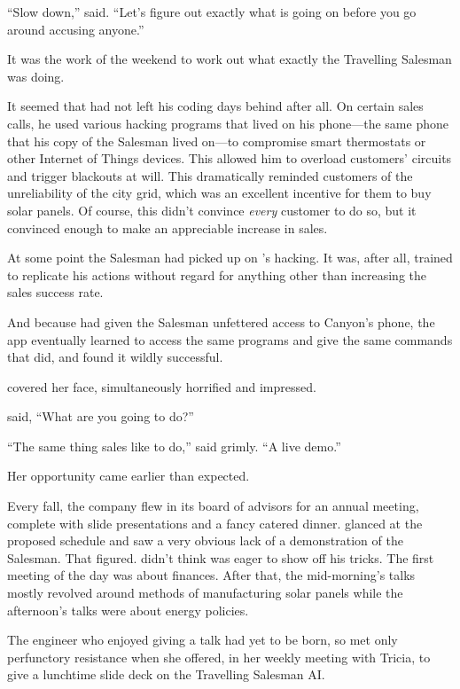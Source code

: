 ``Slow down,'' {\sidetag} said. ``Let's figure out exactly what is going on before you go around accusing anyone.''

It was the work of the weekend to work out what exactly the Travelling Salesman was doing.

It seemed that {\energyJerk} had not left his coding days behind after all. On certain sales calls, he used various hacking programs that lived on his phone---the same phone that his copy of the Salesman lived on---to compromise smart thermostats or other Internet of Things devices. This allowed him to overload customers' circuits and trigger blackouts at will. This dramatically reminded customers of the unreliability of the city grid, which was an excellent incentive for them to buy solar panels. Of course, this didn't convince \emph{every} customer to do so, but it convinced enough to make an appreciable increase in sales.

At some point the Salesman had picked up on {\energyJerk}'s hacking. It was, after all, trained to replicate his actions without regard for anything other than increasing the sales success rate.

And because {\protag} had given the Salesman unfettered access to Canyon's phone, the app eventually learned to access the same programs and give the same commands that {\energyJerk} did, and found it wildly successful.

{\protag} covered her face, simultaneously horrified and impressed.

{\sidetag} said, ``What are you going to do?''

``The same thing sales like to do,'' {\protag} said grimly. ``A live demo.''

\bigbreak

Her opportunity came earlier than expected.

Every fall, the company flew in its board of advisors for an annual meeting, complete with slide presentations and a fancy catered dinner. {\protag} glanced at the proposed schedule and saw a very obvious lack of a demonstration of the Salesman. That figured. {\protag} didn't think {\energyJerk} was eager to show off his tricks. The first meeting of the day was about finances. After that, the mid-morning's talks mostly revolved around methods of manufacturing solar panels while the afternoon's talks were about energy policies.

The engineer who enjoyed giving a talk had yet to be born, so {\protag} met only perfunctory resistance when she offered, in her weekly meeting with Tricia, to give a lunchtime slide deck on the Travelling Salesman AI.

